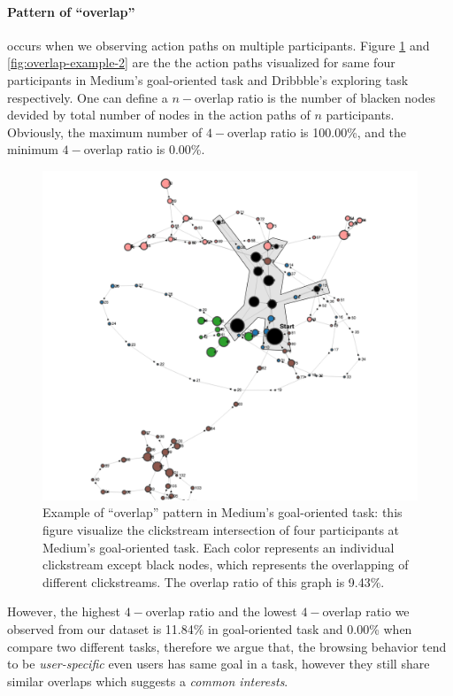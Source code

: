 \paragraph{Pattern of ``overlap''}
occurs when we observing action paths on multiple participants. Figure \ref{fig:overlap-example-1}
and \ref{fig:overlap-example-2} are the the action paths visualized for same four participants
in Medium's goal-oriented task and Dribbble's exploring task respectively.
One can define a $n-$overlap ratio is the number of blacken nodes devided by total number of nodes
in the action paths of $n$ participants. Obviously, the maximum number of $4-$overlap ratio
is 100.00\%, and the minimum $4-$overlap ratio is 0.00\%.

\begin{figure}
    \centering
    \includegraphics[width=1\textwidth]{figures/overlap1}
    \caption{Example of ``overlap'' pattern in Medium's goal-oriented task: 
    this figure visualize the clickstream intersection 
    of four participants at Medium's goal-oriented task. Each color represents an
    individual clickstream except black nodes, which represents the overlapping of different clickstreams.
    The overlap ratio of this graph is 9.43\%.}
    \label{fig:overlap-example-1}
\end{figure}

However, the highest $4-$overlap ratio and the lowest $4-$overlap ratio we observed from our
dataset is 11.84\% in goal-oriented task and 0.00\% when compare two different tasks, 
therefore we argue that, the browsing behavior tend to be \emph{user-specific} even users has same
goal in a task, however they still share similar overlaps which suggests a \emph{common interests}.

